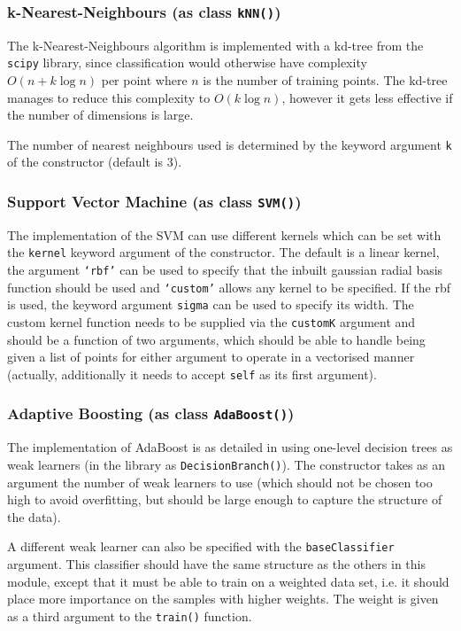 \documentclass[a4paper, 12pt]{article}
\begin{document}
\subsubsection{k-Nearest-Neighbours (as class \texttt{kNN()})}
The k-Nearest-Neighbours algorithm is implemented with a kd-tree from the \texttt{scipy} library, since classification would otherwise have complexity $O(n + k \log n)$ per point where $n$ is the number of training points. The kd-tree manages to reduce this complexity to $O(k \log n)$, however it gets less effective if the number of dimensions is large.

The number of nearest neighbours used is determined by the keyword argument \texttt{k} of the constructor (default is 3).

\subsubsection{Support Vector Machine (as class \texttt{SVM()})}
The implementation of the SVM can use different kernels which can be set with the \texttt{kernel} keyword argument of the constructor. The default is a linear kernel, the argument \texttt{`rbf'} can be used to specify that the inbuilt gaussian radial basis function should be used and \texttt{`custom'} allows any kernel to be specified. If the rbf is used, the keyword argument \texttt{sigma} can be used to specify its width. The custom kernel function needs to be supplied via the \texttt{customK} argument and should be a function of two arguments, which should be able to handle being given a list of points for either argument to operate in a vectorised manner (actually, additionally it needs to accept \texttt{self} as its first argument).

\subsubsection{Adaptive Boosting (as class \texttt{AdaBoost()})}
The implementation of AdaBoost is as detailed in \cite{PRML} using one-level decision trees as weak learners (in the library as \texttt{DecisionBranch()}). The constructor takes as an argument the number of weak learners to use (which should not be chosen too high to avoid overfitting, but should be large enough to capture the structure of the data).

A different weak learner can also be specified with the \texttt{baseClassifier} argument. This classifier should have the same structure as the others in this module, except that it must be able to train on a weighted data set, i.e. it should place more importance on the samples with higher weights. The weight is given as a third argument to the \texttt{train()} function.
\end{document}
